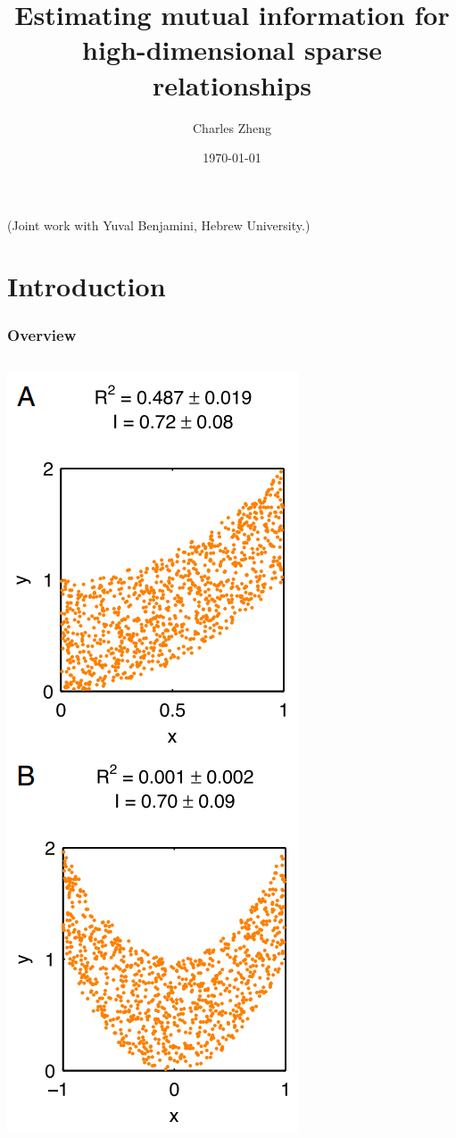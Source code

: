 \documentclass{beamer}
\title[Mutual information]{Estimating mutual information for high-dimensional sparse relationships}
\author{Charles Zheng} %
\institute[Stanford] %
{Stanford University}
\date{\today} %
\begin{document}
\begin{frame}
\titlepage %
(Joint work with Yuval Benjamini, Hebrew University.)
\end{frame}


\section{Introduction}

\begin{frame}
\frametitle{Overview}
\begin{columns}
\begin{column}{0.25\textwidth}
\includegraphics[scale = 0.27]{kinney3.png}

\end{column}
\end{columns}
\end{frame}
\end{document}
